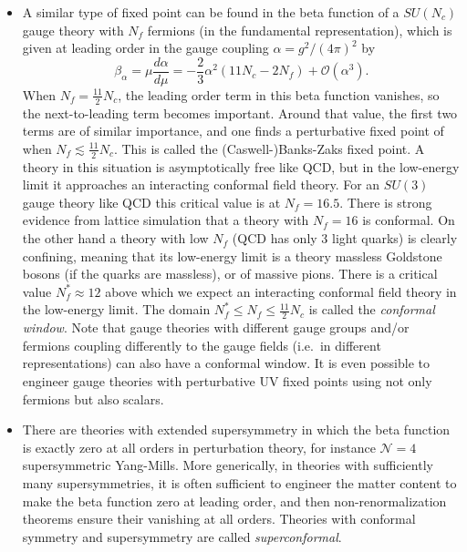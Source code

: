 \documentclass[a4paper,12pt]{article}
\numberwithin{equation}{section}
\begin{document}
\begin{itemize}
\item
A similar type of fixed point can be found in the beta function of a $SU(N_c)$ gauge theory with $N_f$ fermions (in the fundamental representation), which is given at leading order in the gauge coupling $\alpha = g^2/(4\pi)^2$ by
\begin{equation}
	\beta_\alpha = \mu \frac{d\alpha}{d\mu}
	= -\frac{2}{3} \alpha^2 \left(11 N_c - 2 N_f \right)
	+ \mathcal{O}(\alpha^3).
\end{equation}
When $N_f = \frac{11}{2} N_c$, the leading order term in this beta function vanishes, so the next-to-leading term becomes important. Around that value, the first two terms are of similar importance, and one finds a perturbative fixed point of when $N_f \lesssim \frac{11}{2} N_c$. This is called the (Caswell-)Banks-Zaks fixed point. A theory in this situation is asymptotically free like QCD, but in the low-energy limit it approaches an interacting conformal field theory.
For an $SU(3)$ gauge theory like QCD this critical value is at $N_f = 16.5$. There is strong evidence from lattice simulation that a theory with $N_f = 16$ is conformal. On the other hand a theory with low $N_f$ (QCD has only 3 light quarks) is clearly confining, meaning that its low-energy limit is a theory massless Goldstone bosons (if the quarks are massless), or of massive pions. There is a critical value $N_f^* \approx 12$ above which we expect an interacting conformal field theory in the low-energy limit. The domain $N_f^* \leq N_f \leq \frac{11}{2} N_c$ is called the \emph{conformal window}. Note that gauge theories with different gauge groups and/or fermions coupling differently to the gauge fields (i.e.~in different representations) can also have a conformal window. It is even possible to engineer gauge theories with perturbative UV fixed points using not only fermions but also scalars.

\item
There are theories with extended supersymmetry in which the beta function is exactly zero at all orders in perturbation theory, for instance $\mathcal{N} = 4$ supersymmetric Yang-Mills. More generically, in theories with sufficiently many supersymmetries, it is often sufficient to engineer the matter content to make the beta function zero at leading order, and then non-renormalization theorems ensure their vanishing at all orders. Theories with conformal symmetry and supersymmetry are called \emph{superconformal}.


\end{itemize}
\end{document}
